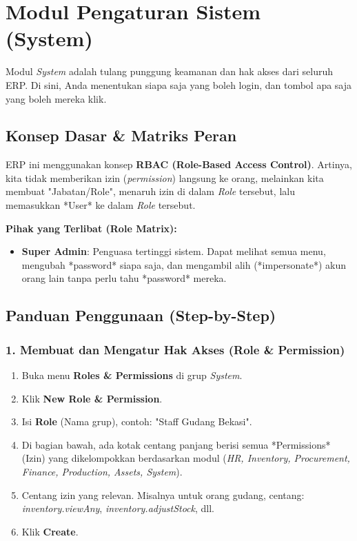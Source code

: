 \chapter{Modul Pengaturan Sistem (System)}

Modul \textit{System} adalah tulang punggung keamanan dan hak akses dari seluruh ERP. Di sini, Anda menentukan siapa saja yang boleh login, dan tombol apa saja yang boleh mereka klik.

\section{Konsep Dasar \& Matriks Peran}
ERP ini menggunakan konsep \textbf{RBAC (Role-Based Access Control)}.
Artinya, kita tidak memberikan izin (\textit{permission}) langsung ke orang, melainkan kita membuat "Jabatan/Role", menaruh izin di dalam \textit{Role} tersebut, lalu memasukkan *User* ke dalam \textit{Role} tersebut.

\textbf{Pihak yang Terlibat (Role Matrix):}
\begin{itemize}
    \item \textbf{Super Admin}: Penguasa tertinggi sistem. Dapat melihat semua menu, mengubah *password* siapa saja, dan mengambil alih (*impersonate*) akun orang lain tanpa perlu tahu *password* mereka.
\end{itemize}

\section{Panduan Penggunaan (Step-by-Step)}

\subsection{1. Membuat dan Mengatur Hak Akses (Role \& Permission)}
\begin{enumerate}
    \item Buka menu \textbf{Roles \& Permissions} di grup \textit{System}.
    \item Klik \textbf{New Role \& Permission}.
    \item Isi \textbf{Role} (Nama grup), contoh: "Staff Gudang Bekasi".
    \item Di bagian bawah, ada kotak centang panjang berisi semua *Permissions* (Izin) yang dikelompokkan berdasarkan modul (\textit{HR, Inventory, Procurement, Finance, Production, Assets, System}).
    \item Centang izin yang relevan. Misalnya untuk orang gudang, centang: \textit{inventory.viewAny}, \textit{inventory.adjustStock}, dll.
    \item Klik \textbf{Create}.
\end{enumerate}

